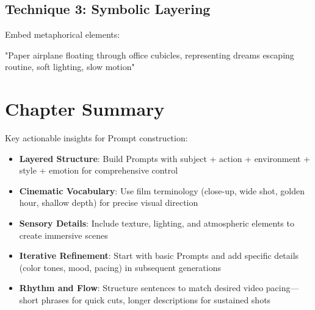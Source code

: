 \subsection*{Technique 3: Symbolic Layering}
Embed metaphorical elements:
\begin{Prompt}
"Paper airplane floating through office cubicles, representing dreams escaping routine, soft lighting, slow motion"
\end{Prompt}



\section*{Chapter Summary}

Key actionable insights for Prompt construction:

\begin{itemize}
\item \textbf{Layered Structure}: Build Prompts with subject + action + environment + style + emotion for comprehensive control
\item \textbf{Cinematic Vocabulary}: Use film terminology (close-up, wide shot, golden hour, shallow depth) for precise visual direction
\item \textbf{Sensory Details}: Include texture, lighting, and atmospheric elements to create immersive scenes
\item \textbf{Iterative Refinement}: Start with basic Prompts and add specific details (color tones, mood, pacing) in subsequent generations
\item \textbf{Rhythm and Flow}: Structure sentences to match desired video pacing—short phrases for quick cuts, longer descriptions for sustained shots
\end{itemize}
